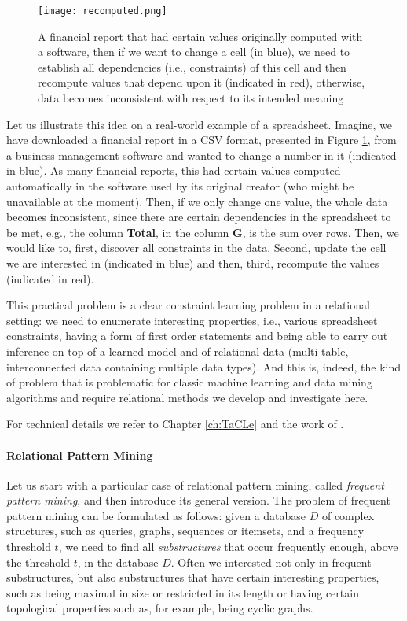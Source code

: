 \pubrev
\begin{figure}[thb]
  \begin{center}
    \texttt{[image: recomputed.png]}
  \end{center}
  \caption{A financial report that had certain values originally computed with a software, then if we want to change a cell (in blue), we need to establish all dependencies (i.e., constraints) of this cell and then recompute values that depend upon it (indicated in red), otherwise, data becomes inconsistent with respect to its intended meaning}
  \label{fig:report_spreadsheet}
\end{figure}

Let us illustrate this idea on a real-world example of a spreadsheet. Imagine, we have downloaded a financial report in a CSV format, presented in Figure \ref{fig:report_spreadsheet}, from a business management software and wanted to change a number in it (indicated in blue). As many financial reports, this had certain values computed automatically in the software used by its original creator (who might be unavailable at the moment). Then, if we only change one value, the whole data becomes inconsistent, since there are certain dependencies in the spreadsheet to be met, e.g., the column \textbf{Total}, in the column \textbf{G}, is the sum over rows. Then, we would like to, first, discover all constraints in the data. Second, update the cell we are interested in (indicated in blue) and then, third, recompute the values (indicated in red). 

This practical problem is a clear constraint learning problem in a relational setting: we need to enumerate interesting properties, i.e., various spreadsheet constraints, having a form of first order statements and being able to carry out inference on top of a learned model and of relational data (multi-table, interconnected data containing multiple data types). And this is, indeed, the kind of problem that is problematic for classic machine learning and data mining algorithms and require relational methods we develop and investigate here.

For technical details we refer to Chapter \ref{ch:TaCLe} and the work of \textcite{tacle_demo}.
\pubrevend


\paragraph{Relational Pattern Mining}
Let us start with a particular case of relational pattern mining,
called \textit{frequent pattern mining}, and then introduce its
general version.  The problem of frequent pattern mining can be formulated as follows:
given a database $D$ of complex structures, such as queries, graphs,
sequences or itemsets, and a frequency threshold $t$, we need to find
all \textit{substructures} that occur frequently enough, above the
threshold $t$, in the database $D$. Often we interested not only in
frequent substructures, but also substructures that have certain
interesting properties, such as being maximal in size or restricted in
its length or having certain topological properties such as, for example,
being cyclic graphs.

